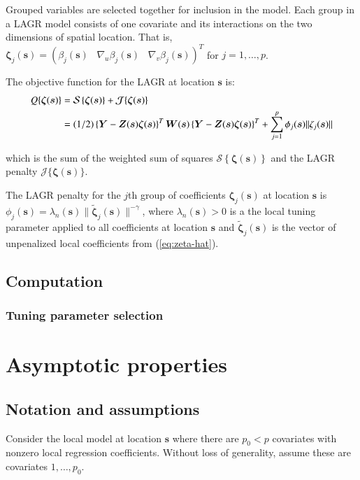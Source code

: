 \documentclass[authoryear, review, 11pt]{elsarticle}
\begin{document}
    Grouped variables are selected together for inclusion in the model. Each group in a LAGR model consists of one covariate and its interactions on the two dimensions of spatial location. That is, $\bm{\zeta}_j(\bm{s}) = \left( \beta_j(\bm{s}) \;\;\; \nabla_u \beta_j(\bm{s}) \;\;\; \nabla_v \beta_j(\bm{s}) \right)^T$ for $j=1, \dots, p$.
	
	The objective function for the LAGR at location $\bm{s}$ is:
	\begin{align}\label{eq:adaptive-lasso-WLS}
		Q \{ \bm{\zeta}(\bm{s}) \} &= \mathcal{S} \left\{ \bm{\zeta}( \bm{s} ) \right\} + \mathcal{J}\{ \bm{\zeta}(\bm{s}) \} \notag \\
		&= (1/2) \left\{ \bm{Y} - \bm{Z}(\bm{s}) \bm{\zeta} (\bm{s}) \right\}^T \bm{W}(\bm{s}) \left\{ \bm{Y} - \bm{Z}(\bm{s}) \bm{\zeta} (\bm{s}) \right\}^T + \sum_{j=1}^p \phi_j(\bm{s}) \| \zeta_j(\bm{s}) \| 
	\end{align}
	
	which is the sum of the weighted sum of squares $\mathcal{S} \left\{ \bm{\zeta}( \bm{s} ) \right\}$ and the LAGR penalty $\mathcal{J}\{ \bm{\zeta}(\bm{s}) \}$.

    The LAGR penalty for the $j$th group of coefficients $\bm{\zeta}_j(\bm{s})$ at location $\bm{s}$ is $\phi_j(\bm{s}) = \lambda_n (\bm{s}) \| \tilde{\bm{\zeta}}_j(\bm{s}) \|^{-\gamma}$, where $\lambda_n (\bm{s}) > 0$ is a the local tuning parameter applied to all coefficients at location $\bm{s}$ and $\tilde{\bm{\zeta}}_j (\bm{s})$ is the vector of unpenalized local coefficients from (\ref{eq:zeta-hat}).


    \subsection{Computation}
        \subsubsection{Tuning parameter selection}

    \section{Asymptotic properties}

        \subsection{Notation and assumptions}
        Consider the local model at location $\bm{s}$ where there are $p_0 < p$ covariates with nonzero local regression coefficients. Without loss of generality, assume these are covariates $1, \dots, p_0$.
\end{document}
